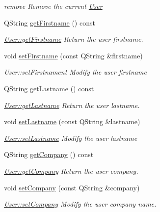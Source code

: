 \begin{DoxyCompactItemize}
\begin{DoxyCompactList}\small\item\em remove Remove the current \hyperlink{classUser}{User} \end{DoxyCompactList}\item 
Q\+String \hyperlink{classUser_acad034d3a093164f056d06d9a3ee33a2}{get\+Firstname} () const 
\begin{DoxyCompactList}\small\item\em \hyperlink{classUser_acad034d3a093164f056d06d9a3ee33a2}{User\+::get\+Firstname} Return the user firstname. \end{DoxyCompactList}\item 
void \hyperlink{classUser_ad9f69006800232eb19146d2354910412}{set\+Firstname} (const Q\+String \&firstname)
\begin{DoxyCompactList}\small\item\em User\+::set\+Firstnament Modify the user {\itshape firstname} \end{DoxyCompactList}\item 
Q\+String \hyperlink{classUser_aabbb05d0c6e6be5ed078ba3c730b24b3}{get\+Lastname} () const 
\begin{DoxyCompactList}\small\item\em \hyperlink{classUser_aabbb05d0c6e6be5ed078ba3c730b24b3}{User\+::get\+Lastname} Return the user lastname. \end{DoxyCompactList}\item 
void \hyperlink{classUser_a90d5bae75aa56253642386ad42da171d}{set\+Lastname} (const Q\+String \&lastname)
\begin{DoxyCompactList}\small\item\em \hyperlink{classUser_a90d5bae75aa56253642386ad42da171d}{User\+::set\+Lastname} Modify the user {\itshape lastname} \end{DoxyCompactList}\item 
Q\+String \hyperlink{classUser_ace35ae55a1681e5df796ebee79fa5b07}{get\+Company} () const 
\begin{DoxyCompactList}\small\item\em \hyperlink{classUser_ace35ae55a1681e5df796ebee79fa5b07}{User\+::get\+Company} Return the user company. \end{DoxyCompactList}\item 
void \hyperlink{classUser_a3a92e61c3e31dddeff27bc8c2307f2db}{set\+Company} (const Q\+String \&company)
\begin{DoxyCompactList}\small\item\em \hyperlink{classUser_a3a92e61c3e31dddeff27bc8c2307f2db}{User\+::set\+Company} Modify the user {\itshape company} name. \end{DoxyCompactList}\item 

\end{DoxyCompactItemize}
